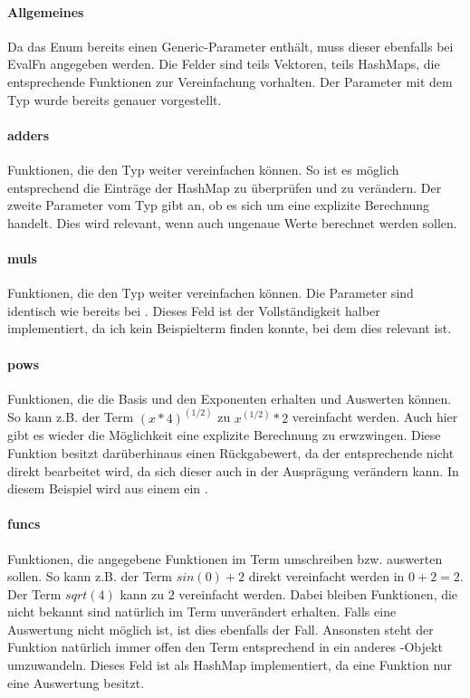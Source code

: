 \documentclass[11pt,a4paper, ngerman]{article}
\begin{document}
\paragraph{Allgemeines} Da das Enum  bereits einen Generic-Parameter enthält, muss dieser ebenfalls bei EvalFn angegeben werden. Die Felder sind teils Vektoren, teils HashMaps, die entsprechende Funktionen zur Vereinfachung vorhalten. Der Parameter mit dem Typ  wurde bereits genauer vorgestellt.

\paragraph{adders} Funktionen, die den Typ  weiter vereinfachen können. So ist es möglich entsprechend die Einträge der HashMap zu überprüfen und zu verändern. Der zweite Parameter vom Typ  gibt an, ob es sich um eine explizite Berechnung handelt. Dies wird relevant, wenn auch ungenaue Werte berechnet werden sollen.

\paragraph{muls} Funktionen, die den Typ  weiter vereinfachen können. Die Parameter sind identisch wie bereits bei . Dieses Feld ist der Vollständigkeit halber implementiert, da ich kein Beispielterm finden konnte, bei dem dies relevant ist.

\paragraph{pows} Funktionen, die die Basis und den Exponenten erhalten und Auswerten können. So kann z.B. der Term $(x*4)^{(1/2)}$ zu $x^{(1/2)}*2$ vereinfacht werden. Auch hier gibt es wieder die Möglichkeit eine explizite Berechnung zu erwzwingen. Diese Funktion besitzt darüberhinaus einen Rückgabewert, da der entsprechende  nicht direkt bearbeitet wird, da sich dieser auch in der Ausprägung verändern kann. In diesem Beispiel wird aus einem  ein .

\paragraph{funcs} Funktionen, die angegebene Funktionen im Term umschreiben bzw. auswerten sollen. So kann z.B. der Term $sin(0) + 2$ direkt vereinfacht werden in $0 + 2 = 2$. Der Term $sqrt(4)$ kann zu $2$ vereinfacht werden. Dabei bleiben Funktionen, die  nicht bekannt sind natürlich im Term unverändert erhalten. Falls eine Auswertung nicht möglich ist, ist dies ebenfalls der Fall. Ansonsten steht der Funktion natürlich immer offen den Term entsprechend in ein anderes -Objekt umzuwandeln. Dieses Feld ist als HashMap implementiert, da eine Funktion nur eine Auswertung besitzt.
\end{document}
